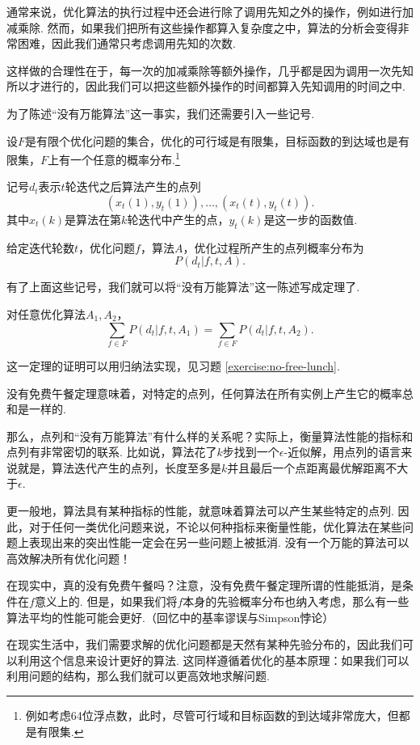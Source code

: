\begin{remark}
    通常来说，优化算法的执行过程中还会进行除了调用先知之外的操作，例如进行加减乘除. 然而，如果我们把所有这些操作都算入复杂度之中，算法的分析会变得非常困难，因此我们通常只考虑调用先知的次数. 
    
    这样做的合理性在于，每一次的加减乘除等额外操作，几乎都是因为调用一次先知所以才进行的，因此我们可以把这些额外操作的时间都算入先知调用的时间之中. 
\end{remark}

为了陈述“没有万能算法”这一事实，我们还需要引入一些记号. 

设$F$是有限个优化问题的集合，优化的可行域是有限集，目标函数的到达域也是有限集，$F$上有一个任意的概率分布.\footnote{例如考虑64位浮点数，此时，尽管可行域和目标函数的到达域非常庞大，但都是有限集.}

记号$d_t$表示$t$轮迭代之后算法产生的点列
\[(x_t(1),y_t(1)),\dots,(x_t(t),y_t(t)).\]
其中$x_t(k)$是算法在第$k$轮迭代中产生的点，$y_t(k)$是这一步的函数值.

给定迭代轮数$t$，优化问题$f$，算法$A$，优化过程所产生的点列概率分布为
\[P(d_t|f,t,A).\]

有了上面这些记号，我们就可以将“没有万能算法”这一陈述写成定理了. 

\begin{theorem}[没有免费午餐定理]\label{thm:no-free-lunch}
对任意优化算法$A_1,A_2$，
    \[\sum_{f\in F} P(d_t|f,t,A_1)=\sum_{f\in F} P(d_t|f,t,A_2).\]
\end{theorem}

这一定理的证明可以用归纳法实现，见习题 \ref{exercise:no-free-lunch}.

没有免费午餐定理意味着，对特定的点列，任何算法在所有实例上产生它的概率总和是一样的. 

那么，点列和“没有万能算法”有什么样的关系呢？实际上，衡量算法性能的指标和点列有非常密切的联系. 比如说，算法花了$k$步找到一个$\epsilon$-近似解，用点列的语言来说就是，算法迭代产生的点列，长度至多是$k$并且最后一个点距离最优解距离不大于$\epsilon$. 

更一般地，算法具有某种指标的性能，就意味着算法可以产生某些特定的点列. 因此，对于任何一类优化问题来说，不论以何种指标来衡量性能，优化算法在某些问题上表现出来的突出性能一定会在另一些问题上被抵消. 没有一个万能的算法可以高效解决所有优化问题！

\begin{remark}
    在现实中，真的没有免费午餐吗？注意，没有免费午餐定理所谓的性能抵消，是条件在$f$意义上的. 但是，如果我们将$f$本身的先验概率分布也纳入考虑，那么有一些算法平均的性能可能会更好.（回忆中的基率谬误与Simpson悖论）
    
    在现实生活中，我们需要求解的优化问题都是天然有某种先验分布的，因此我们可以利用这个信息来设计更好的算法. 这同样遵循着优化的基本原理：如果我们可以利用问题的结构，那么我们就可以更高效地求解问题.
\end{remark}

